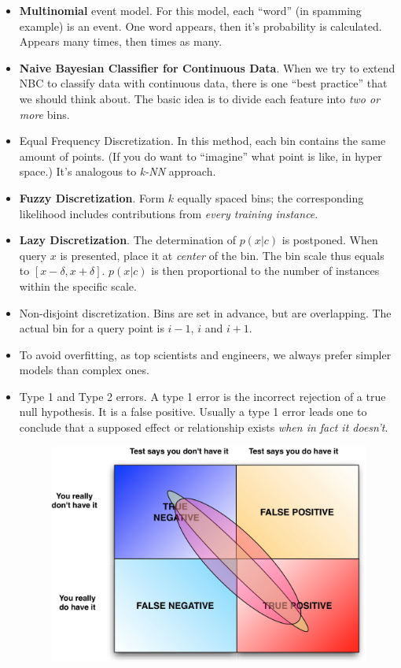 \documentclass[twocolumn]{article}
\begin{document}
\begin{itemize}
\item \textbf{Multinomial} event model. For this model, each ``word''
  (in spamming example) is an event. One word appears, then it's
  probability is calculated. Appears many times, then times as many.
\item \textbf{Naive Bayesian Classifier for Continuous Data}. When we
  try to extend NBC to classify data with continuous data, there is
  one ``best practice'' that we should think about. The basic idea is
  to divide each feature into \emph{two or more} bins. 
\item Equal Frequency Discretization. In this method, each bin
  contains the same amount of points. (If you do want to ``imagine''
  what point is like, in hyper space.) It's analogous to \emph{k-NN}
  approach. 
\item \textbf{Fuzzy Discretization}. Form $k$ equally spaced bins; the
  corresponding likelihood includes contributions from \emph{every
    training instance}.
\item \textbf{Lazy Discretization}. The determination of $p(x|c)$ is
  postponed. When query $x$ is presented, place it at \emph{center} of
  the bin. The bin scale thus equals to
  $[x-\delta,x+\delta]$. $p(x|c)$ is then proportional to the number
  of instances within the specific scale. 
\item Non-disjoint discretization. Bins are set in advance, but are
  overlapping. The actual bin for a query point is $i-1$, $i$ and
  $i+1$. 
\item To avoid overfitting, as top scientists and engineers, we always
  prefer simpler models than complex ones.
\item Type 1 and Type 2 errors. A type 1 error is the incorrect
  rejection of a true null hypothesis. It is a false positive. Usually
  a type 1 error leads one to conclude that a supposed effect or
  relationship exists \emph{when in fact it doesn't}.
  \begin{figure}[htbp]
    \centering
    \includegraphics[scale=0.5]{falsetrue}

\end{figure}
\end{itemize}
\end{document}
